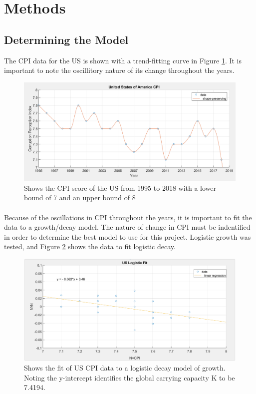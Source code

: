 \documentclass{article}
\begin{document}
	\section{Methods}
		\subsection{Determining the Model}
		The CPI data for the US is shown with a trend-fitting curve in Figure \ref{USA CPI}. It is important to note the oscillitory nature of its change throughout the years.	
		\begin{figure}[h]
		\centering
		\includegraphics[width=1\textwidth]{USA_CPI}
		\caption{Shows the CPI score of the US from 1995 to 2018 with a lower bound of 7 and an upper bound of 8}
		\label{USA CPI}
		\end{figure}

		\paragraph{}
		Because of the oscillations in CPI throughout the years, it is important to fit the data to a growth/decay model. The nature of change in CPI must be indentified in order to determine the best model to use for this project. Logistic growth was tested, and Figure \ref{Logistic Fit} shows the data to fit logistic decay.
		\begin{figure}[h]
		\centering
		\includegraphics[width=1\textwidth]{logistic_fit}
		\caption{Shows the fit of US CPI data to a logistic decay model of growth. Noting the y-intercept identifies the global carrying capacity K to be 7.4194.}
		\label{Logistic Fit}
		\end{figure}
\end{document}
